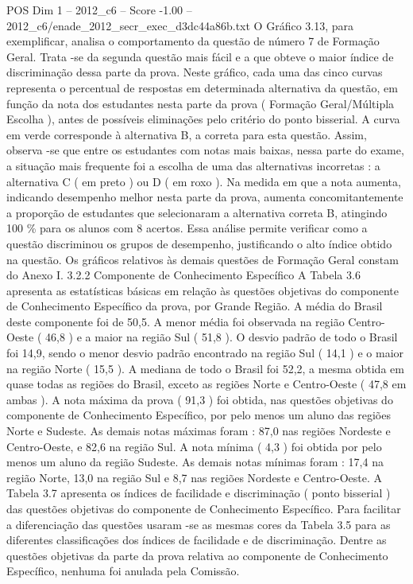 \begin{textsample}{POS Dim 1 – 2012\_c6 – Score -1.00 – 2012\_c6/enade\_2012\_secr\_exec\_d3dc44a86b.txt}
O Gráfico 3.13, para exemplificar, analisa o comportamento da questão de número 7 de Formação Geral.
Trata -se da segunda questão mais fácil e a que obteve o maior índice de discriminação dessa parte da prova.
Neste gráfico, cada uma das cinco curvas representa o percentual de respostas em determinada alternativa da questão, em função da nota dos estudantes nesta parte da prova ( Formação Geral/Múltipla Escolha ), antes de possíveis eliminações pelo critério do ponto bisserial.
A curva em verde corresponde à alternativa B, a correta para esta questão.
Assim, observa -se que entre os estudantes com notas mais baixas, nessa parte do exame, a situação mais frequente foi a escolha de uma das alternativas incorretas : a alternativa C ( em preto ) ou D ( em roxo ).
Na medida em que a nota aumenta, indicando desempenho melhor nesta parte da prova, aumenta concomitantemente a proporção de estudantes que selecionaram a alternativa correta B, atingindo 100 \% para os alunos com 8 acertos.
Essa análise permite verificar como a questão discriminou os grupos de desempenho, justificando o alto índice obtido na questão.
Os gráficos relativos às demais questões de Formação Geral constam do Anexo I. 3.2.2 Componente de Conhecimento Específico A Tabela 3.6 apresenta as estatísticas básicas em relação às questões objetivas do componente de Conhecimento Específico da prova, por Grande Região.
A média do Brasil deste componente foi de 50,5.
A menor média foi observada na região Centro-Oeste ( 46,8 ) e a maior na região Sul ( 51,8 ).
O desvio padrão de todo o Brasil foi 14,9, sendo o menor desvio padrão encontrado na região Sul ( 14,1 ) e o maior na região Norte ( 15,5 ).
A mediana de todo o Brasil foi 52,2, a mesma obtida em quase todas as regiões do Brasil, exceto as regiões Norte e Centro-Oeste ( 47,8 em ambas ).
A nota máxima da prova ( 91,3 ) foi obtida, nas questões objetivas do componente de Conhecimento Específico, por pelo menos um aluno das regiões Norte e Sudeste.
As demais notas máximas foram : 87,0 nas regiões Nordeste e Centro-Oeste, e 82,6 na região Sul.
A nota mínima ( 4,3 ) foi obtida por pelo menos um aluno da região Sudeste.
As demais notas mínimas foram : 17,4 na região Norte, 13,0 na região Sul e 8,7 nas regiões Nordeste e Centro-Oeste.
A Tabela 3.7 apresenta os índices de facilidade e discriminação ( ponto bisserial ) das questões objetivas do componente de Conhecimento Específico.
Para facilitar a diferenciação das questões usaram -se as mesmas cores da Tabela 3.5 para as diferentes classificações dos índices de facilidade e de discriminação.
Dentre as questões objetivas da parte da prova relativa ao componente de Conhecimento Específico, nenhuma foi anulada pela Comissão.

\end{textsample}
